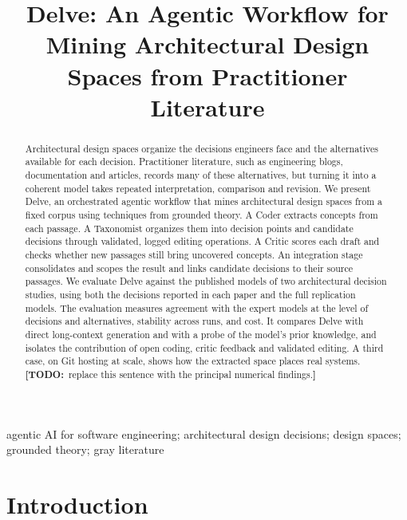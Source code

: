 \documentclass[conference]{IEEEtran}
\newcommand{\todo}[1]{{\color{red}\textbf{[TODO:}~#1\textbf{]}}}
\begin{document}
\title{Delve: An Agentic Workflow for Mining Architectural Design Spaces from Practitioner Literature}

\author{
}

\maketitle

\begin{abstract}
Architectural design spaces organize the decisions engineers face and the alternatives available for each decision. Practitioner literature, such as engineering blogs, documentation and articles, records many of these alternatives, but turning it into a coherent model takes repeated interpretation, comparison and revision. We present Delve, an orchestrated agentic workflow that mines architectural design spaces from a fixed corpus using techniques from grounded theory. A Coder extracts concepts from each passage. A Taxonomist organizes them into decision points and candidate decisions through validated, logged editing operations. A Critic scores each draft and checks whether new passages still bring uncovered concepts. An integration stage consolidates and scopes the result and links candidate decisions to their source passages. We evaluate Delve against the published models of two architectural decision studies, using both the decisions reported in each paper and the full replication models. The evaluation measures agreement with the expert models at the level of decisions and alternatives, stability across runs, and cost. It compares Delve with direct long-context generation and with a probe of the model's prior knowledge, and isolates the contribution of open coding, critic feedback and validated editing. A third case, on Git hosting at scale, shows how the extracted space places real systems. \todo{replace this sentence with the principal numerical findings.}
\end{abstract}

\begin{IEEEkeywords}
agentic AI for software engineering; architectural design decisions; design spaces; grounded theory; gray literature
\end{IEEEkeywords}

\section{Introduction}
\end{document}
